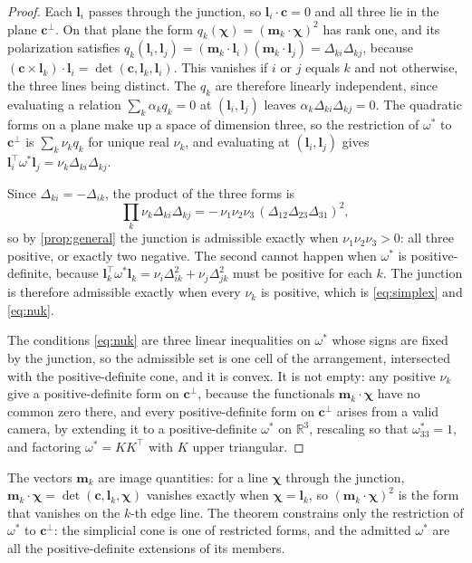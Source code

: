 \documentclass[pdflatex,sn-mathphys-num,iicol]{sn-jnl}
\newcommand{\vl}{\mathbf{l}}
\newcommand{\vc}{\mathbf{c}}
\newcommand{\vm}{\mathbf{m}}
\theoremstyle{thmstyleone}
\theoremstyle{thmstylethree}
\theoremstyle{thmstyletwo}
\begin{document}
\begin{proof}
Each $\vl_i$ passes through the junction, so $\vl_i\cdot\vc=0$ and all three lie in the plane $\vc^{\perp}$. On that plane the form $q_k(\boldsymbol\chi)=(\vm_k\cdot\boldsymbol\chi)^2$ has rank one, and its polarization satisfies $q_k(\vl_i,\vl_j)=(\vm_k\cdot\vl_i)(\vm_k\cdot\vl_j)=\Delta_{ki}\Delta_{kj}$, because $(\vc\times\vl_k)\cdot\vl_i=\det(\vc,\vl_k,\vl_i)$. This vanishes if $i$ or $j$ equals $k$ and not otherwise, the three lines being distinct. The $q_k$ are therefore linearly independent, since evaluating a relation $\sum_k\alpha_kq_k=0$ at $(\vl_i,\vl_j)$ leaves $\alpha_k\Delta_{ki}\Delta_{kj}=0$. The quadratic forms on a plane make up a space of dimension three, so the restriction of $\omega^{*}$ to $\vc^{\perp}$ is $\sum_k\nu_kq_k$ for unique real $\nu_k$, and evaluating at $(\vl_i,\vl_j)$ gives $\vl_i^{\top}\omega^{*}\vl_j=\nu_k\Delta_{ki}\Delta_{kj}$.

Since $\Delta_{ki}=-\Delta_{ik}$, the product of the three forms is
\[
\prod_{k}\nu_k\Delta_{ki}\Delta_{kj}=-\,\nu_1\nu_2\nu_3\,(\Delta_{12}\Delta_{23}\Delta_{31})^2 ,
\]
so by \cref{prop:general} the junction is admissible exactly when $\nu_1\nu_2\nu_3>0$: all three positive, or exactly two negative. The second cannot happen when $\omega^{*}$ is positive-definite, because $\vl_k^{\top}\omega^{*}\vl_k=\nu_i\Delta_{ik}^2+\nu_j\Delta_{jk}^2$ must be positive for each $k$. The junction is therefore admissible exactly when every $\nu_k$ is positive, which is \eqref{eq:simplex} and \eqref{eq:nuk}.

The conditions \eqref{eq:nuk} are three linear inequalities on $\omega^{*}$ whose signs are fixed by the junction, so the admissible set is one cell of the arrangement, intersected with the positive-definite cone, and it is convex. It is not empty: any positive $\nu_k$ give a positive-definite form on $\vc^{\perp}$, because the functionals $\vm_k\cdot\boldsymbol\chi$ have no common zero there, and every positive-definite form on $\vc^{\perp}$ arises from a valid camera, by extending it to a positive-definite $\omega^{*}$ on $\mathbb R^3$, rescaling so that $\omega^{*}_{33}=1$, and factoring $\omega^{*}=KK^{\top}$ with $K$ upper triangular.
\end{proof}

The vectors $\vm_k$ are image quantities: for a line $\boldsymbol\chi$ through the junction, $\vm_k\cdot\boldsymbol\chi=\det(\vc,\vl_k,\boldsymbol\chi)$ vanishes exactly when $\boldsymbol\chi=\vl_k$, so $(\vm_k\cdot\boldsymbol\chi)^2$ is the form that vanishes on the $k$-th edge line. The theorem constrains only the restriction of $\omega^{*}$ to $\vc^{\perp}$: the simplicial cone is one of restricted forms, and the admitted $\omega^{*}$ are all the positive-definite extensions of its members.
\end{document}
